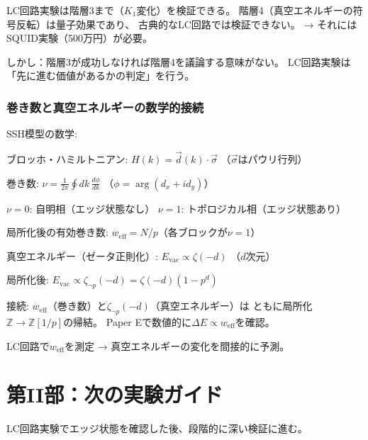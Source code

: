 \documentclass[12pt,a4paper]{article}
\begin{document}
LC回路実験は階層3まで（$K_1$変化）を検証できる。
階層4（真空エネルギーの符号反転）は量子効果であり、
古典的なLC回路では検証できない。
→ それにはSQUID実験（500万円）が必要。

しかし：階層3が成功しなければ階層4を議論する意味がない。
LC回路実験は「先に進む価値があるかの判定」を行う。

\section{巻き数と真空エネルギーの数学的接続}

\begin{deepbox}
SSH模型の数学:

ブロッホ・ハミルトニアン: $H(k) = \vec{d}(k) \cdot \vec{\sigma}$
（$\vec{\sigma}$はパウリ行列）

巻き数: $\nu = \frac{1}{2\pi}\oint dk\, \frac{d\phi}{dk}$
（$\phi = \arg(d_x + i d_y)$）

$\nu = 0$: 自明相（エッジ状態なし）
$\nu = 1$: トポロジカル相（エッジ状態あり）

局所化後の有効巻き数: $w_{\mathrm{eff}} = N/p$（各ブロックが$\nu=1$）

真空エネルギー（ゼータ正則化）:
$E_{\mathrm{vac}} \propto \zeta(-d)$ （$d$次元）

局所化後: $E_{\mathrm{vac}} \propto \zeta_{\neg p}(-d) = \zeta(-d)(1-p^d)$

接続: $w_{\mathrm{eff}}$（巻き数）と$\zeta_{\neg p}(-d)$（真空エネルギー）は
ともに局所化$\mathbb{Z} \to \mathbb{Z}[1/p]$の帰結。
Paper Eで数値的に$\Delta E \propto w_{\mathrm{eff}}$を確認。

LC回路で$w_{\mathrm{eff}}$を測定 → 真空エネルギーの変化を間接的に予測。
\end{deepbox}


\newpage
\part*{第II部：次の実験ガイド}

LC回路実験でエッジ状態を確認した後、段階的に深い検証に進む。
\end{document}

